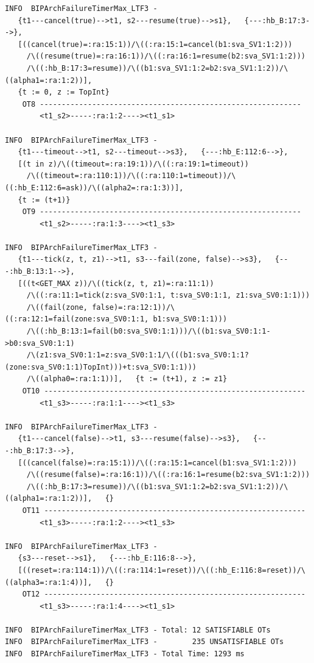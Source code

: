 \documentclass{llncs}
\begin{document}
\begin{verbatim}
INFO  BIPArchFailureTimerMax_LTF3 -
   {t1---cancel(true)-->t1, s2---resume(true)-->s1},   {---:hb_B:17:3-->},
   [((cancel(true)=:ra:15:1))/\((:ra:15:1=cancel(b1:sva_SV1:1:2)))
     /\((resume(true)=:ra:16:1))/\((:ra:16:1=resume(b2:sva_SV1:1:2)))
     /\((:hb_B:17:3=resume))/\((b1:sva_SV1:1:2=b2:sva_SV1:1:2))/\((alpha1=:ra:1:2))],
   {t := 0, z := TopInt}
    OT8 ------------------------------------------------------------
        <t1_s2>-----:ra:1:2----><t1_s1>

INFO  BIPArchFailureTimerMax_LTF3 -
   {t1---timeout-->t1, s2---timeout-->s3},   {---:hb_E:112:6-->},
   [(t in z)/\((timeout=:ra:19:1))/\((:ra:19:1=timeout))
     /\((timeout=:ra:110:1))/\((:ra:110:1=timeout))/\((:hb_E:112:6=ask))/\((alpha2=:ra:1:3))],
   {t := (t+1)}
    OT9 ------------------------------------------------------------
        <t1_s2>-----:ra:1:3----><t1_s3>

INFO  BIPArchFailureTimerMax_LTF3 -
   {t1---tick(z, t, z1)-->t1, s3---fail(zone, false)-->s3},   {---:hb_B:13:1-->},
   [((t<GET_MAX z))/\((tick(z, t, z1)=:ra:11:1))
     /\((:ra:11:1=tick(z:sva_SV0:1:1, t:sva_SV0:1:1, z1:sva_SV0:1:1)))
     /\((fail(zone, false)=:ra:12:1))/\((:ra:12:1=fail(zone:sva_SV0:1:1, b1:sva_SV0:1:1)))
     /\((:hb_B:13:1=fail(b0:sva_SV0:1:1)))/\((b1:sva_SV0:1:1->b0:sva_SV0:1:1)
     /\(z1:sva_SV0:1:1=z:sva_SV0:1:1/\(((b1:sva_SV0:1:1?(zone:sva_SV0:1:1)TopInt)))+t:sva_SV0:1:1)))
     /\((alpha0=:ra:1:1))],   {t := (t+1), z := z1}
    OT10 ------------------------------------------------------------
        <t1_s3>-----:ra:1:1----><t1_s3>

INFO  BIPArchFailureTimerMax_LTF3 -
   {t1---cancel(false)-->t1, s3---resume(false)-->s3},   {---:hb_B:17:3-->},
   [((cancel(false)=:ra:15:1))/\((:ra:15:1=cancel(b1:sva_SV1:1:2)))
     /\((resume(false)=:ra:16:1))/\((:ra:16:1=resume(b2:sva_SV1:1:2)))
     /\((:hb_B:17:3=resume))/\((b1:sva_SV1:1:2=b2:sva_SV1:1:2))/\((alpha1=:ra:1:2))],   {}
    OT11 ------------------------------------------------------------
        <t1_s3>-----:ra:1:2----><t1_s3>

INFO  BIPArchFailureTimerMax_LTF3 -
   {s3---reset-->s1},   {---:hb_E:116:8-->},
   [((reset=:ra:114:1))/\((:ra:114:1=reset))/\((:hb_E:116:8=reset))/\((alpha3=:ra:1:4))],   {}
    OT12 ------------------------------------------------------------
        <t1_s3>-----:ra:1:4----><t1_s1>

INFO  BIPArchFailureTimerMax_LTF3 - Total: 12 SATISFIABLE OTs
INFO  BIPArchFailureTimerMax_LTF3 -        235 UNSATISFIABLE OTs
INFO  BIPArchFailureTimerMax_LTF3 - Total Time: 1293 ms
\end{verbatim}
\end{document}
